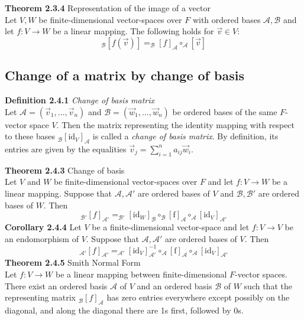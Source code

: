 \documentclass[8pt,landscape]{article}
\begin{document}
\begin{multicols}{3}
    \textbf{Theorem 2.3.4} Representation of the image of a vector \\
    Let $V,W$ be finite-dimensional vector-spaces over $F$ with ordered bases
    $\mathcal{A,B}$ and let $f : V \to W$ be a linear mapping.
    The following holds for $\vec{v} \in V$:
    \[
        _\mathcal{B}{[f(\vec{v})]} = _\mathcal{B}{[f]}_\mathcal{A} \circ
        _\mathcal{A}[\vec{v}]
    \]
    \subsection{Change of a matrix by change of basis}
    \textbf{Definition 2.4.1} \emph{Change of basis matrix} \\
    Let $\mathcal{A} = (\vec{v}_1, \ldots, \vec{v}_n)$ and $\mathcal{B} =
    (\vec{w}_1, \ldots, \vec{w}_n)$
    be ordered bases of the same $F$-vector space $V$.
    Then the matrix representing the identity mapping with respect to these bases
    $_\mathcal{B}{[\mathrm{id}_V]}_\mathcal{A}$
    is called a \emph{change of basis matrix}.
    By definition, its entries are given by the equalities $\vec{v}_j =
    \sum_{i=1}^n a_{ij}\vec{w}_i$.

    \textbf{Theorem 2.4.3} Change of basis \\
    Let $V$ and $W$ be finite-dimensional vector-spaces over $F$ and let $f : V \to W$
    be a linear mapping.
    Suppose that $\mathcal{A, A'}$ are ordered bases of $V$ and $\mathcal{B, B'}$
    are ordered bases of $W$.
    Then
    \[
        _\mathcal{B'}{[f]}_\mathcal{A'} = _\mathcal{B'}{[\mathrm{id}_W]}_\mathcal{B}
        \circ _\mathcal{B}{[\mathrm{f}]}_\mathcal{A} \circ
        _\mathcal{A}{[\mathrm{id}_V]}_\mathcal{A'}
    \]
    \textbf{Corollary 2.4.4}
    Let $V$ be a finite-dimensional vector-space and let
    $f : V \to V$ be an endomorphism of $V$.
    Suppose that $\mathcal{A, A'}$ are ordered bases of $V$.
    Then
    \[
        _\mathcal{A'}{[f]}_\mathcal{A'} =
        _\mathcal{A'}{[\mathrm{id}_V]}^{-1}_\mathcal{A'}
        \circ _\mathcal{A}{[\mathrm{f}]}_\mathcal{A} \circ _\mathcal{A}
        {[\mathrm{id}_V]}_\mathcal{A'}
    \]
    \textbf{Theorem 2.4.5} Smith Normal Form \\
    Let $f : V \to W$ be a linear mapping between finite-dimensional $F$-vector spaces.
    There exist an ordered basis $\mathcal{A}$ of $V$ and an ordered basis
    $\mathcal{B}$ of $W$
    such that the representing matrix $_\mathcal{B}{[f]}_\mathcal{A}$
    has zero entries everywhere except possibly on the diagonal,
    and along the diagonal there are 1s first, followed by 0s.


\end{multicols}
\end{document}
